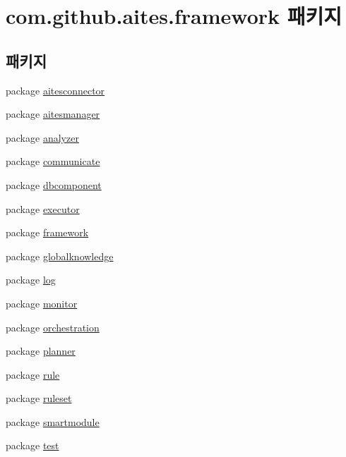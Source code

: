 \hypertarget{namespacecom_1_1github_1_1aites_1_1framework}{}\section{com.\+github.\+aites.\+framework 패키지}
\label{namespacecom_1_1github_1_1aites_1_1framework}
\subsection*{패키지}
\begin{DoxyCompactItemize}
\item 
package \mbox{\hyperlink{namespacecom_1_1github_1_1aites_1_1framework_1_1aitesconnector}{aitesconnector}}
\item 
package \mbox{\hyperlink{namespacecom_1_1github_1_1aites_1_1framework_1_1aitesmanager}{aitesmanager}}
\item 
package \mbox{\hyperlink{namespacecom_1_1github_1_1aites_1_1framework_1_1analyzer}{analyzer}}
\item 
package \mbox{\hyperlink{namespacecom_1_1github_1_1aites_1_1framework_1_1communicate}{communicate}}
\item 
package \mbox{\hyperlink{namespacecom_1_1github_1_1aites_1_1framework_1_1dbcomponent}{dbcomponent}}
\item 
package \mbox{\hyperlink{namespacecom_1_1github_1_1aites_1_1framework_1_1executor}{executor}}
\item 
package \mbox{\hyperlink{namespacecom_1_1github_1_1aites_1_1framework_1_1framework}{framework}}
\item 
package \mbox{\hyperlink{namespacecom_1_1github_1_1aites_1_1framework_1_1globalknowledge}{globalknowledge}}
\item 
package \mbox{\hyperlink{namespacecom_1_1github_1_1aites_1_1framework_1_1log}{log}}
\item 
package \mbox{\hyperlink{namespacecom_1_1github_1_1aites_1_1framework_1_1monitor}{monitor}}
\item 
package \mbox{\hyperlink{namespacecom_1_1github_1_1aites_1_1framework_1_1orchestration}{orchestration}}
\item 
package \mbox{\hyperlink{namespacecom_1_1github_1_1aites_1_1framework_1_1planner}{planner}}
\item 
package \mbox{\hyperlink{namespacecom_1_1github_1_1aites_1_1framework_1_1rule}{rule}}
\item 
package \mbox{\hyperlink{namespacecom_1_1github_1_1aites_1_1framework_1_1ruleset}{ruleset}}
\item 
package \mbox{\hyperlink{namespacecom_1_1github_1_1aites_1_1framework_1_1smartmodule}{smartmodule}}
\item 
package \mbox{\hyperlink{namespacecom_1_1github_1_1aites_1_1framework_1_1test}{test}}
\end{DoxyCompactItemize}
